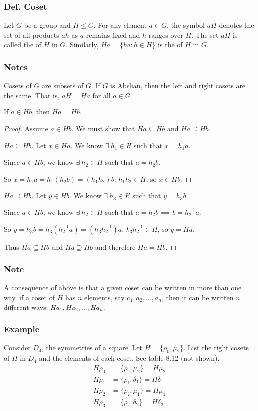 \subsubsection{Def. Coset}
Let $G$ be a group and $H \leq G$. For any element $a \in G$, the symbol $aH$ denotes the set of all products $ah$ as $a$ remains fixed and $h$ ranges over $H$. The set $aH$ is called the  of $H$ in $G$. Similarly, $Ha = \{ha : h \in H\}$ is the  of $H$ in $G$.

\subsubsection*{Notes}
Cosets of $G$ are subsets of $G$. If $G$ is Abelian, then the left and right cosets are the same. That is, $aH = Ha$ for all $a \in G$.

If $a \in Hb$, then $Ha = Hb$.
\begin{proof}
    Assume $a \in Hb$. We must show that $Ha \subseteq Hb$ and $Ha \supseteq Hb$.
    \begin{proof}[$Ha \subseteq Hb$]
        Let $x \in Ha$. We know $\exists~h_1 \in H$ such that $x = h_1a$.

        Since $a \in Hb$, we know $\exists~h_2 \in H$ such that $a = h_2b$.

        So $x = h_1a = h_1(h_2b) = (h_1h_2)b$. $h_1h_2 \in H$, so $x \in Hb$.
    \end{proof}
    \begin{proof}[$Ha \supseteq Hb$]
        Let $y \in Hb$. We know $\exists~h_3 \in H$ such that $y = h_3b$.

        Since $a \in Hb$, we know $\exists~h_2 \in H$ such that $a = h_2b \implies b = h_2^{-1}a$.

        So $y = h_3b = h_3(h_2^{-1}a) = (h_3h_2^{-1})a$. $h_3h_2^{-1} \in H$, so $y = Ha$.
    \end{proof}
    Thus $Ha \subseteq Hb$ and $Ha \supseteq Hb$ and therefore $Ha = Hb$.
\end{proof}

\subsubsection*{Note}
A consequence of above is that a given coset can be written in more than one way. if a coset of $H$ has $n$ elements, say $a_1,a_2,\ldots,a_n$, then it can be written $n$ different ways: $Ha_1,Ha_2,\ldots,Ha_n$.

\subsubsection*{Example}
Consider $D_4$, the symmetries of a square. Let $H = \{\rho_0,\mu_2\}$. List the right cosets of $H$ in $D_4$ and the elements of each coset. See table 8.12 (not shown).
\begin{align*}
    H\rho_0 & = \{\rho_0, \mu_2\} = H\mu_2 \\
    H\rho_1 & = \{\rho_1, \delta_1\} = H\delta_1 \\
    H\rho_2 & = \{\rho_2, \mu_1\} = H\mu_1 \\
    H\rho_3 & = \{\rho_3, \delta_2\} = H\delta_2
\end{align*}